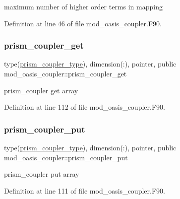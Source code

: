 maximum number of higher order terms in mapping 



Definition at line 46 of file mod\+\_\+oasis\+\_\+coupler.\+F90.

\mbox{\label{namespacemod__oasis__coupler_a96df3ef2ec1b53597bb9beca43fe8349}} 
\subsubsection{\texorpdfstring{prism\+\_\+coupler\+\_\+get}{prism\_coupler\_get}}
{\footnotesize\ttfamily type(\hyperlink{structmod__oasis__coupler_1_1prism__coupler__type}{prism\+\_\+coupler\+\_\+type}), dimension(\+:), pointer, public mod\+\_\+oasis\+\_\+coupler\+::prism\+\_\+coupler\+\_\+get}



prism\+\_\+coupler get array 



Definition at line 112 of file mod\+\_\+oasis\+\_\+coupler.\+F90.

\mbox{\label{namespacemod__oasis__coupler_ae59d8823993d9ca8610efd9770393271}} 
\subsubsection{\texorpdfstring{prism\+\_\+coupler\+\_\+put}{prism\_coupler\_put}}
{\footnotesize\ttfamily type(\hyperlink{structmod__oasis__coupler_1_1prism__coupler__type}{prism\+\_\+coupler\+\_\+type}), dimension(\+:), pointer, public mod\+\_\+oasis\+\_\+coupler\+::prism\+\_\+coupler\+\_\+put}



prism\+\_\+coupler put array 



Definition at line 111 of file mod\+\_\+oasis\+\_\+coupler.\+F90.

\mbox{\label{namespacemod__oasis__coupler_aaa019c39b0f657e7c37820697ecf354a}} 
